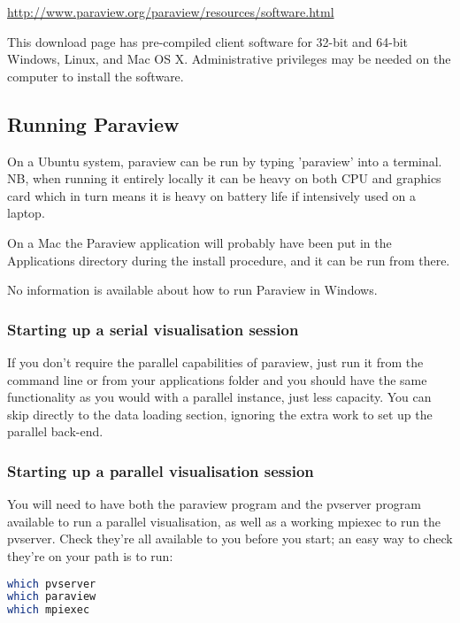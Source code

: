 \url{http://www.paraview.org/paraview/resources/software.html}

This download page has pre-compiled client software for 32-bit and 64-bit
Windows, Linux, and Mac OS X. Administrative privileges may be needed on the
computer to install the software.

\subsection{Running Paraview}

On a Ubuntu system, paraview can be run by typing 'paraview' into a
terminal. NB, when running it entirely locally it can be heavy on both CPU
and graphics card which in turn means it is heavy on battery life if
intensively used on a laptop.

On a Mac the Paraview application will probably have been put in the
Applications directory during the install procedure, and it can be run from
there.

No information is available about how to run Paraview in Windows.

\subsubsection{Starting up a serial visualisation session}

If you don't require the parallel capabilities of paraview, just run it from
the command line or from your applications folder and you should have the
same functionality as you would with a parallel instance, just less
capacity. You can skip directly to the data loading section, ignoring the
extra work to set up the parallel back-end.

\subsubsection{Starting up a parallel visualisation session}

You will need to have both the paraview program and the pvserver program
available to run a parallel visualisation, as well as a working mpiexec to
run the pvserver. Check they're all available to you before you start; an
easy way to check they're on your path is to run:

\begin{example}
  \begin{lstlisting}[language=bash]
which pvserver
which paraview
which mpiexec
\end{lstlisting}
\end{example}

